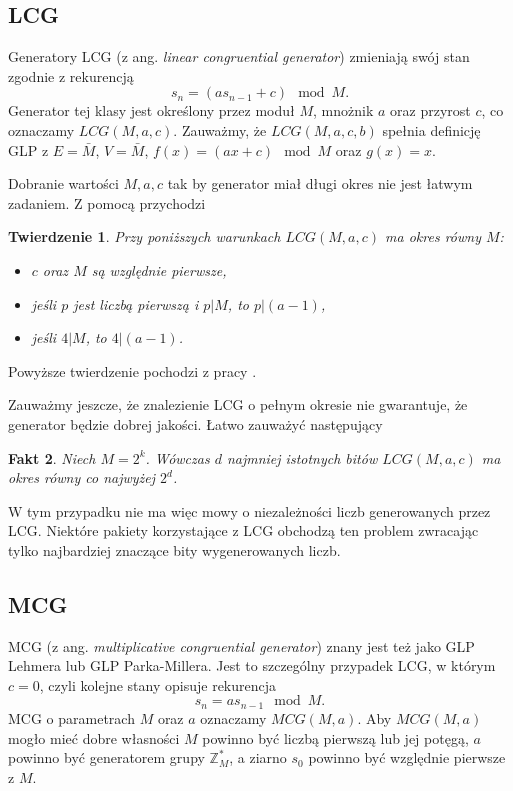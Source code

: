 \documentclass[a4paper,11pt,twoside]{book}
\newtheorem{twier}{Twierdzenie}[chapter]
\newtheorem{fakt}[twier]{Fakt}
\theoremstyle{definition}
\begin{document}
\subsection*{LCG}
Generatory LCG (z ang. \textit{linear congruential generator}) zmieniają swój stan zgodnie z rekurencją
\begin{equation}
 \label{eq:lcg}
 s_n = (a s_{n-1} + c) \mod M.
\end{equation}
Generator tej klasy jest określony przez moduł $M$, mnożnik $a$ oraz przyrost $c$, co oznaczamy $LCG(M,a,c)$. Zauważmy, że $LCG(M,a,c,b)$ spełnia definicję GLP z $E = \bar{M}$, $V = \bar{M}$, $f(x) = (a x + c) \mod M$ oraz $g(x) = x$.

Dobranie wartości $M, a, c$ tak by generator miał długi okres nie jest łatwym zadaniem. Z pomocą przychodzi
\begin{twier}
  Przy poniższych warunkach $LCG(M,a,c)$ ma okres równy $M$:
  \begin{itemize}
   \item $c$ oraz $M$ są względnie pierwsze,
   \item jeśli $p$ jest liczbą pierwszą i $p | M$, to $p |(a - 1)$,
   \item jeśli $4 | M$, to $4 |(a-1)$.
  \end{itemize}
\end{twier}
\noindent Powyższe twierdzenie pochodzi z pracy \cite{hull}.

Zauważmy jeszcze, że znalezienie LCG o pełnym okresie nie gwarantuje, że generator będzie dobrej jakości. Łatwo zauważyć następujący
\begin{fakt}
 Niech $M = 2^k$. Wówczas $d$ najmniej istotnych bitów $LCG(M,a,c)$ ma okres równy co najwyżej $2^d$.
\end{fakt}
\noindent W tym przypadku nie ma więc mowy o niezależności liczb generowanych przez LCG. Niektóre pakiety korzystające z LCG obchodzą ten problem zwracając tylko najbardziej znaczące bity wygenerowanych liczb.

\subsection*{MCG}
MCG (z ang. \textit{multiplicative congruential generator}) znany jest też jako GLP Lehmera lub GLP Parka-Millera. 
Jest to szczególny przypadek LCG, w którym $c = 0$, czyli kolejne stany opisuje rekurencja
\begin{equation}
 \label{eq:mcg}
 s_n = a s_{n-1} \mod M.
\end{equation}
MCG o parametrach $M$ oraz $a$ oznaczamy $MCG(M, a)$. Aby $MCG(M,a)$ mogło mieć dobre własności $M$ powinno być liczbą pierwszą lub jej potęgą, $a$ powinno być generatorem grupy $\mathbb{Z}_M^*$, a ziarno $s_0$ powinno być względnie pierwsze z $M$. 
\end{document}
